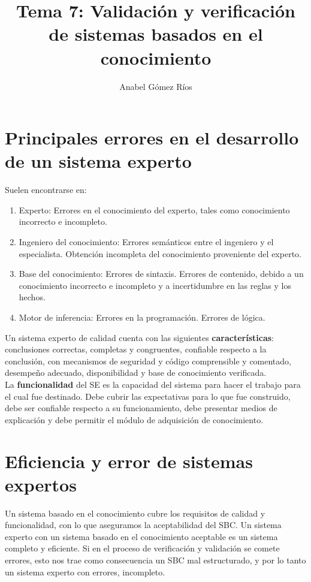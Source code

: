 \documentclass[12pt]{article}
\title{Tema 7: Validación y verificación de sistemas basados en el conocimiento}
\author{Anabel G\'omez R\'ios}
\begin{document}
\maketitle

\section{Principales errores en el desarrollo de un sistema experto}
Suelen encontrarse en:
\begin{enumerate}
\item Experto: Errores en el conocimiento del experto, tales como conocimiento incorrecto e incompleto.
\item Ingeniero del conocimiento: Errores semánticos entre el ingeniero y el especialista. Obtención incompleta del conocimiento proveniente del experto.
\item Base del conocimiento: Errores de sintaxis. Errores de contenido, debido a un conocimiento incorrecto e incompleto y a incertidumbre en las reglas y los hechos.
\item Motor de inferencia: Errores en la programación. Errores de lógica.
\end{enumerate}

Un sistema experto de calidad cuenta con las siguientes \textbf{características}: conclusiones correctas, completas y congruentes, confiable respecto a la conclusión, con mecanismos de seguridad y código comprensible y comentado, desempeño adecuado, disponibilidad y base de conocimiento verificada.\\

La \textbf{funcionalidad} del SE es la capacidad del sistema para hacer el trabajo para el cual fue destinado. Debe cubrir las expectativas para lo que fue construido, debe ser confiable respecto a su funcionamiento, debe presentar medios de explicación y debe permitir el módulo de adquisición de conocimiento.

\section{Eficiencia y error de sistemas expertos}
Un sistema basado en el conocimiento cubre los requisitos de calidad y funcionalidad, con lo que aseguramos la aceptabilidad del SBC. Un sistema experto con un sistema basado en el conocimiento aceptable es un sistema completo y eficiente. Si en el proceso de verificación y validación se comete errores, esto nos trae como consecuencia un SBC mal estructurado, y por lo tanto un sistema experto con errores, incompleto.\\
\end{document}

